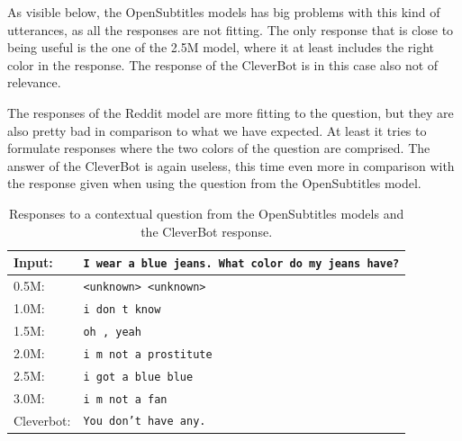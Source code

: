 As visible below, the OpenSubtitles models has big problems with this kind of utterances, as all the responses are not fitting. The only response that is close to being useful is the one of the 2.5M model, where it at least includes the right color in the response. The response of the CleverBot is in this case also not of relevance.

The responses of the Reddit model are more fitting to the question, but they are also pretty bad in comparison to what we have expected. At least it tries to formulate responses where the two colors of the question are comprised. The answer of the CleverBot is again useless, this time even more in comparison with the response given when using the question from the OpenSubtitles model.
\\
\begin{table}[H]
	\centering
	\begin{adjustbox}{max width=\textwidth}
		\begin{tabular}{ll}
			\toprule
			Input: 	& \texttt{I wear a blue jeans. What color do my jeans have?}\\
			\midrule
			0.5M: 	& \texttt{<unknown> <unknown>}\\
			1.0M: 	& \texttt{i don t know}\\
			1.5M:	& \texttt{oh , yeah}\\
			2.0M:	& \texttt{i m not a prostitute}\\
			2.5M:	& \texttt{i got a blue blue}\\
			3.0M:	& \texttt{i m not a fan}\\
			Cleverbot:	& \texttt{You don't have any.}\\
			\bottomrule
		\end{tabular}
	\end{adjustbox}
	\caption{Responses to a contextual question from the OpenSubtitles models and the CleverBot response.}
	\label{results:example4_output:OpenSubtitle_compared}
\end{table}
